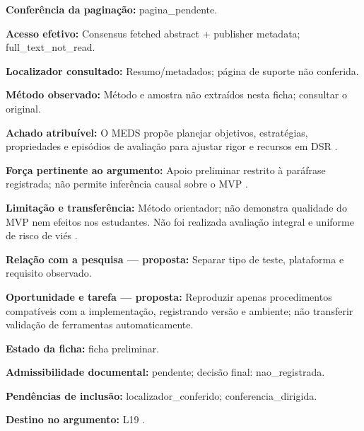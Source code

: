 \noindent\textbf{Conferência da paginação:} pagina\_pendente.\par\medskip

\noindent\textbf{Acesso efetivo:} Consensus fetched abstract + publisher metadata; full\_text\_not\_read.\par\medskip

\noindent\textbf{Localizador consultado:} Resumo/metadados; página de suporte não conferida.\par\medskip

\noindent\textbf{Método observado:} Método e amostra não extraídos nesta ficha; consultar o original.\par\medskip

\noindent\textbf{Achado atribuível:} O MEDS propõe planejar objetivos, estratégias, propriedades e episódios de avaliação para ajustar rigor e recursos em DSR \citep{eng20}.\par\medskip

\noindent\textbf{Força pertinente ao argumento:} Apoio preliminar restrito à paráfrase registrada; não permite inferência causal sobre o MVP \citep{eng20}.\par\medskip

\noindent\textbf{Limitação e transferência:} Método orientador; não demonstra qualidade do MVP nem efeitos nos estudantes. Não foi realizada avaliação integral e uniforme de risco de viés \citep{eng20}.\par\medskip

\noindent\textbf{Relação com a pesquisa — proposta:} Separar tipo de teste, plataforma e requisito observado.\par\medskip

\noindent\textbf{Oportunidade e tarefa — proposta:} Reproduzir apenas procedimentos compatíveis com a implementação, registrando versão e ambiente; não transferir validação de ferramentas automaticamente.\par\medskip

\noindent\textbf{Estado da ficha:} ficha preliminar.\par\medskip

\noindent\textbf{Admissibilidade documental:} pendente; decisão final: nao\_registrada.\par\medskip

\noindent\textbf{Pendências de inclusão:} localizador\_conferido; conferencia\_dirigida.\par\medskip

\noindent\textbf{Destino no argumento:} L19 .


